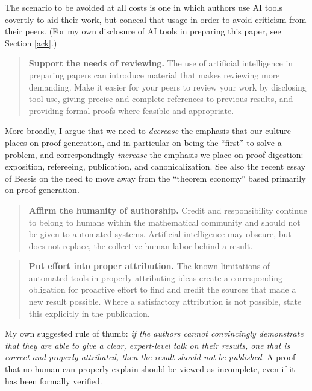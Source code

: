 \documentclass[12pt]{amsart}
\theoremstyle{definition}
\begin{document}
\medskip

The scenario to be avoided at all costs is one in which authors use AI tools covertly to aid their work, but conceal that usage in order to avoid criticism from their peers.  (For my own disclosure of AI tools in preparing this paper, see Section \ref{ack}.)

\medskip

\begin{quote}
  \textbf{Support the needs of reviewing.} The use of artificial intelligence in preparing papers can introduce material that makes reviewing more demanding. Make it easier for your peers to review your work by disclosing tool use, giving precise and complete references to previous results, and providing formal proofs where feasible and appropriate.
\end{quote}

\medskip

More broadly, I argue that we need to \emph{decrease} the emphasis that our culture places on proof generation, and in particular on being the ``first'' to solve a problem, and correspondingly \emph{increase} the emphasis we place on proof digestion: exposition, refereeing, publication, and canonicalization.  See also the recent essay of Bessis \cite{bessis} on the need to move away from the ``theorem economy'' based primarily on proof generation. 

\medskip

\begin{quote}
  \textbf{Affirm the humanity of authorship.} Credit and responsibility continue to belong to humans within the mathematical community and should not be given to automated systems. Artificial intelligence may obscure, but does not replace, the collective human labor behind a result.
\end{quote}

\medskip

\begin{quote}
\textbf{Put effort into proper attribution.} The known limitations of automated tools in properly attributing ideas create a corresponding obligation for proactive effort to find and credit the sources that made a new result possible. Where a satisfactory attribution is not possible, state this explicitly in the publication.
\end{quote}


\medskip

My own suggested rule of thumb: \emph{if the authors cannot convincingly demonstrate that they are able to give a clear, expert-level talk on their results, one that is correct and properly attributed, then the result should not be published}.  A proof that no human can properly explain should be viewed as incomplete, even if it has been formally verified.
\end{document}
